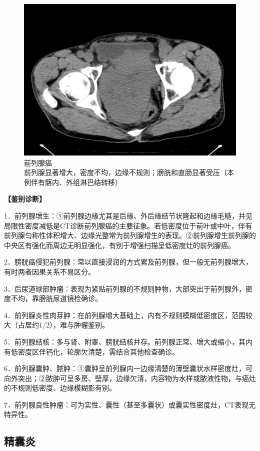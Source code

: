 \begin{figure}[!htbp]
 \centering
 \includegraphics[width=.7\textwidth,height=\textheight,keepaspectratio]{./images/Image00400.jpg}
 \captionsetup{justification=centering}
 \caption{前列腺癌\\{\small 前列腺显著增大，密度不均，边缘不规则；膀胱和直肠显著受压（本例伴有髂内、外组淋巴结转移）}}
 \label{fig21-4}
  \end{figure} 

\textbf{【鉴别诊断】}

1．前列腺增生：①前列腺边缘尤其是后缘、外后缘结节状隆起和边缘毛糙，并见局限性密度减低是CT诊断前列腺癌的主要征象。若低密度位于前叶或中叶，伴有前列腺匀称性体积增大、边缘光整常为前列腺增生的表现。②前列腺增生前列腺的中央区有强化而周边无明显强化，有别于增强扫描呈低密度灶的前列腺癌。

2．膀胱癌侵犯前列腺：常以直接浸润的方式累及前列腺，但一般无前列腺增大，有时两者因果关系不易区分。

3．后尿道球部肿瘤：表现为紧贴前列腺的不规则肿物，大部突出于前列腺外，密度不均，靠膀胱尿道镜检确诊。

4．前列腺炎性肉芽肿：在前列腺增大基础上，内有不规则模糊低密度区，范围较大（占居约1/2），难与肿瘤鉴别。

5．前列腺结核：多与肾、附睾、膀胱结核并存。前列腺正常、增大或缩小，其内有低密度区伴钙化，轮廓欠清楚，需结合其他检查确诊。

6．前列腺囊肿、脓肿：①囊肿呈前列腺内一边缘清楚的薄壁囊状水样密度灶，可向外突出；②脓肿可呈多房、壁厚，边缘欠清，内容物为水样或脓液性物，与癌灶的不规则低密度、边缘模糊影有别。

7．前列腺良性肿瘤：可为实性、囊性（甚至多囊状）或囊实性密度灶，CT表现无特异性。

\subsection{精囊炎}

